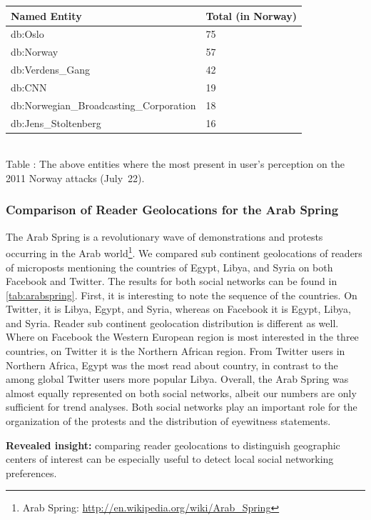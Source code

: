 \documentclass{iosart2c}
\newcommand{\tablecaption}[1]{%
  \\[1em]%
  \refstepcounter{table}%
  Table \arabic{table}: #1%
}
\begin{document}
\begin{table}
    \begin{tabular}{ | l | l |}
    \hline
	\textbf{Named Entity} & \textbf{Total (in Norway)}\\ \hline
	db:Oslo & 75\\
	db:Norway & 57\\
	db:Verdens\_Gang & 42\\
	db:CNN & 19\\
	db:Norwegian\_Broadcasting\_Corporation & 18\\
	db:Jens\_Stoltenberg & 16\\
    \hline
  \end{tabular}
  \tablecaption{The above entities where the most present in user's perception on the 2011 Norway attacks (July~22).}
  \label{tab:norway}  
\end{table}

\subsubsection{Comparison of Reader Geolocations for the Arab Spring}
The Arab Spring is a revolutionary wave of demonstrations and protests occurring in the Arab world\footnote{Arab Spring: \url{http://en.wikipedia.org/wiki/Arab_Spring}}.
We compared sub continent geolocations of readers of microposts mentioning the countries of Egypt, Libya, and Syria on both Facebook and Twitter.
The results for both social networks can be found in \autoref{tab:arabspring}.
First, it is interesting to note the sequence of the countries.
On Twitter, it is Libya, Egypt, and Syria, whereas on Facebook it is Egypt, Libya, and Syria. 
Reader sub continent geolocation distribution is different as well.
Where on Facebook the Western European region is most interested in the three countries, on Twitter it is the Northern African region.
From Twitter users in Northern Africa, Egypt was the most read about country, in contrast to the among global Twitter users more popular Libya.
Overall, the Arab Spring was almost equally represented on both social networks, albeit our numbers are only sufficient for trend analyses.
Both social networks play an important role for the organization of the protests and the distribution of eyewitness statements.

\textbf{Revealed insight:}
comparing reader geolocations to distinguish geographic centers of interest can be especially useful to detect local social networking preferences.
\end{document}
